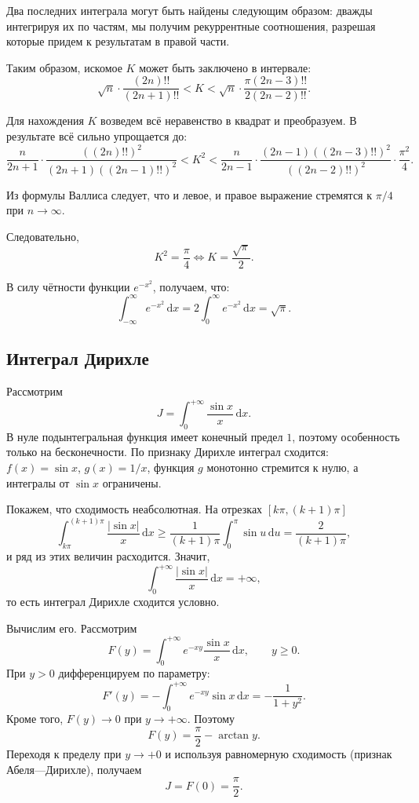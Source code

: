 \documentclass[coursework, och, times]{SCWorks1}
\newcommand{\dd}{\,\mathrm{d}}
\renewcommand{\ge}{\geqslant}
\begin{document}
Два последних интеграла могут быть найдены следующим образом: дважды интегрируя их по частям, мы получим рекуррентные соотношения, разрешая которые придем к результатам в правой части.

Таким образом, искомое \(K\) может быть заключено в интервале:
\[
\sqrt{n} \cdot \frac{(2n)!!}{(2n+1)!!} < K < \sqrt{n} \cdot \frac{\pi(2n - 3)!!}{2(2n - 2)!!}.
\]

Для нахождения \(K\) возведем всё неравенство в квадрат и преобразуем. В результате всё сильно упрощается до:
\[
\frac{n}{2n+1} \cdot \frac{((2n)!!)^2}{(2n+1)((2n-1)!!)^2} < K^2 < \frac{n}{2n-1} \cdot \frac{(2n-1)((2n-3)!!)^2}{((2n-2)!!)^2} \cdot \frac{\pi^2}{4}.
\]

Из формулы Валлиса следует, что и левое, и правое выражение стремятся к \(\pi/4\) при \(n \to \infty\).

Следовательно,
\[
K^2 = \frac{\pi}{4} \iff K = \frac{\sqrt{\pi}}{2}.
\]

В силу чётности функции \(e^{-x^2}\), получаем, что:
\[
\int_{-\infty}^\infty e^{-x^2} \dd x = 2 \int_0^\infty e^{-x^2} \dd x = \sqrt{\pi}.
\]

\subsection{Интеграл Дирихле}

Рассмотрим
\[
J=\int_0^{+\infty}\frac{\sin x}{x}\dd x.
\]
В нуле подынтегральная функция имеет конечный предел \(1\), поэтому особенность только на бесконечности. По признаку Дирихле интеграл сходится: \(f(x)=\sin x\), \(g(x)=1/x\), функция \(g\) монотонно стремится к нулю, а интегралы от \(\sin x\) ограничены.

Покажем, что сходимость неабсолютная. На отрезках \([k\pi,(k+1)\pi]\)
\[
\int_{k\pi}^{(k+1)\pi}\frac{|\sin x|}{x}\dd x
\ge
\frac{1}{(k+1)\pi}\int_0^\pi\sin u\dd u
=
\frac{2}{(k+1)\pi},
\]
и ряд из этих величин расходится. Значит,
\[
\int_0^{+\infty}\frac{|\sin x|}{x}\dd x=+\infty,
\]
то есть интеграл Дирихле сходится условно.

Вычислим его. Рассмотрим
\[
F(y)=\int_0^{+\infty}e^{-xy}\frac{\sin x}{x}\dd x,\qquad y\ge0.
\]
При \(y>0\) дифференцируем по параметру:
\[
F'(y)=-\int_0^{+\infty}e^{-xy}\sin x\dd x
=
-\frac{1}{1+y^2}.
\]
Кроме того, \(F(y)\to0\) при \(y\to+\infty\). Поэтому
\[
F(y)=\frac{\pi}{2}-\arctan y.
\]
Переходя к пределу при \(y\to+0\) и используя равномерную сходимость (признак Абеля—Дирихле), получаем
\[
J=F(0)=\frac{\pi}{2}.
\]
\end{document}
